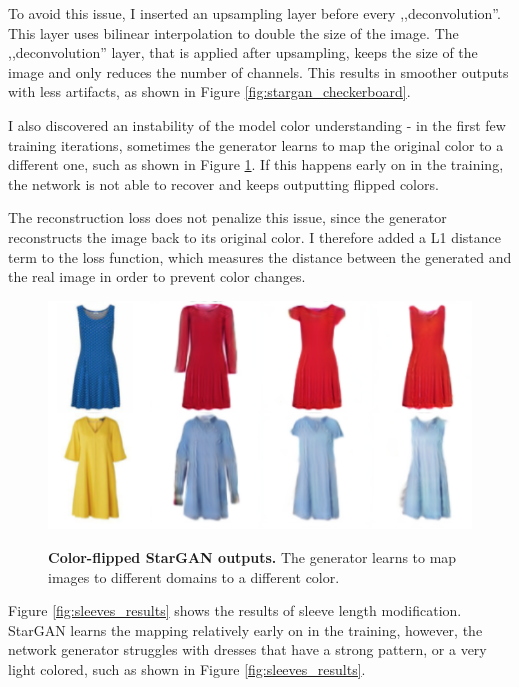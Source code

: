 \documentclass[12pt]{report}
\begin{document}
To avoid this issue, I inserted an upsampling layer before every ,,deconvolution''. This layer uses bilinear interpolation to double the size of the image. The ,,deconvolution'' layer, that is applied after upsampling, keeps the size of the image and only reduces the number of channels. This results in smoother outputs with less artifacts, as shown in Figure \ref{fig:stargan_checkerboard}.

I also discovered an instability of the model color understanding - in the first few training iterations, sometimes the generator learns to map the original color to a different one, such as shown in Figure \ref{fig:stargan_color}. If this happens early on in the training, the network is not able to recover and keeps outputting flipped colors.

The reconstruction loss does not penalize this issue, since the generator reconstructs the image back to its original color. I therefore added a L1 distance term to the loss function, which measures the distance between the generated and the real image in order to prevent color changes.

\begin{figure}[h]
\centering
{\includegraphics[width=.7\linewidth]{04_experiments/stargan/color_flip}}
\caption{\label{fig:stargan_color} \textbf{Color-flipped StarGAN outputs.} The generator learns to map images to different domains to a different color.}
\end{figure}

Figure \ref{fig:sleeves_results} shows the results of sleeve length modification. StarGAN learns the mapping relatively early on in the training, however, the network generator struggles with dresses that have a strong pattern, or a very light colored, such as shown in Figure \ref{fig:sleeves_results}.
\end{document}
